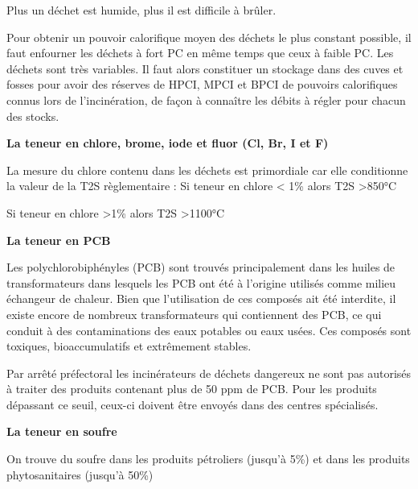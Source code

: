 Plus un déchet est humide, plus il est difficile à brûler.
\vspace{0.3cm}

Pour obtenir un pouvoir calorifique moyen des déchets le plus constant possible, il faut enfourner les déchets à fort PC en même temps que ceux à faible PC.
Les déchets sont très variables. Il faut alors constituer un stockage dans des cuves et fosses pour avoir des réserves de HPCI, MPCI et BPCI de pouvoirs calorifiques connus lors de l’incinération, de façon à connaître les débits à régler pour chacun des stocks.

\vspace{0.3cm}
\textbf{La teneur en chlore, brome, iode et fluor (Cl, Br, I et F)}
\vspace{0.3cm}

La mesure du chlore contenu dans les déchets est primordiale car elle conditionne la valeur de la T2S règlementaire :
Si teneur en chlore  < 1\% alors T2S >850°C

Si teneur en chlore  >1\% alors T2S >1100°C

\vspace{0.3cm}

\textbf{La teneur en PCB}
\vspace{0.3cm}


Les polychlorobiphényles (PCB) sont trouvés principalement dans les huiles de transformateurs dans lesquels les PCB ont été à l’origine utilisés comme milieu échangeur de chaleur. Bien que l’utilisation de ces composés ait été interdite, il existe encore de nombreux transformateurs qui contiennent des PCB, ce qui conduit à des contaminations des eaux potables ou eaux usées. Ces composés sont toxiques, bioaccumulatifs et extrêmement stables.
\vspace{0.3cm}

Par arrêté préfectoral les incinérateurs de déchets dangereux ne sont pas autorisés à traiter des produits contenant plus de 50 ppm de PCB. Pour les produits dépassant ce seuil, ceux-ci doivent être envoyés dans des centres spécialisés.


\vspace{0.3cm}

\textbf{La teneur en soufre}
\vspace{0.3cm}

On trouve du soufre dans les produits pétroliers (jusqu’à 5\%) et dans les produits phytosanitaires (jusqu’à 50\%)

\vspace{0.3cm}

